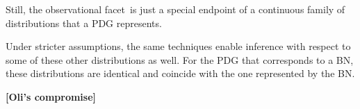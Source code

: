 \documentclass[twoside]{article}
\newcommand\discard[1]{}
\newcommand\obslimit{observational facet} %
\begin{document}
{%
Still, the \obslimit\ is just a special endpoint
of a continuous family of distributions that a PDG represents.
\discard{%
    Still, the  \obslimit\ is just the limit of a parameterized family of
    distributions all of can  be viewed as, in a sense, representing the PDG. }
Under stricter assumptions,
the same techniques enable inference with respect to some of these other distributions as well.
For the PDG that corresponds to a BN, these distributions are identical and coincide with the one represented by the BN.}


{\color{green!50!black}\textbf{[Oli's compromise]}

}
\end{document}
